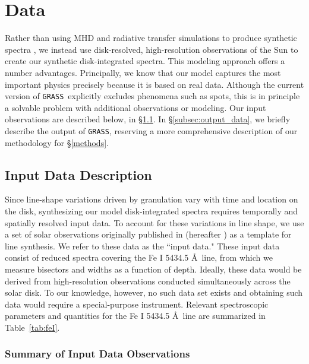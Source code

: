\documentclass[twocolumn]{aastex63}
\newcommand{\grass}{\texttt{GRASS}}
\begin{document}
\section{Data} \label{data}

Rather than using MHD and radiative transfer simulations to produce synthetic spectra \citep[as in previous studies; e.g.,][]{Cegla2018, Cegla2019a}, we instead use disk-resolved, high-resolution observations of the Sun to create our synthetic disk-integrated spectra. This modeling approach offers a number advantages. Principally, we know that our model captures the most important physics precisely because it is based on real data. Although the current version of \grass\ explicitly excludes phenomena such as spots, this is in principle a solvable problem with additional observations or modeling. Our input observations are described below, in \S \ref{subsec:input_data}. In \S \ref{subsec:output_data}, we briefly describe the output of \texttt{GRASS}, reserving a more comprehensive description of our methodology for \S \ref{methods}. \par

\subsection{Input Data Description} \label{subsec:input_data}
Since line-shape variations driven by granulation vary with time and location on the disk, synthesizing our model disk-integrated spectra requires temporally and spatially resolved input data. To account for these variations in line shape, we use a set of solar observations originally published in \citealt{Lohner-Bottcher2019} (hereafter ) as a template for line synthesis. We refer to these data as the ``input data." These input data consist of reduced spectra covering the Fe \textsc{I} 5434.5 \AA\ line, from which we measure bisectors and widths as a function of depth. Ideally, these data would be derived from high-resolution observations conducted simultaneously across the solar disk. To our knowledge, however, no such data set exists and obtaining such data would require a special-purpose instrument. Relevant spectroscopic parameters and quantities for the Fe \textsc{I} 5434.5 \AA\ line are summarized in Table~\ref{tab:feI}. \par

\subsubsection{Summary of Input Data Observations}
\end{document}
